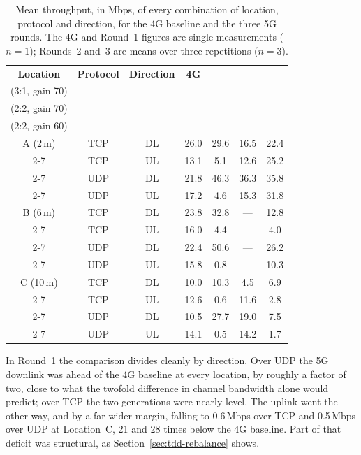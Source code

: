 \begin{table}[htbp]
    \centering
    \begin{tabular}{|c|c|c|c|c|c|c|}
        \hline
        \textbf{Location} & \textbf{Protocol} & \textbf{Direction} & \textbf{4G} & \makecell{\textbf{Round 1}\\(3:1, gain 70)} & \makecell{\textbf{Round 2}\\(2:2, gain 70)} & \makecell{\textbf{Round 3}\\(2:2, gain 60)} \\
        \hline
        A (2\,m) & TCP & DL & 26.0 & 29.6 & 16.5 & 22.4 \\
        \cline{2-7}
         & TCP & UL & 13.1 & 5.1 & 12.6 & 25.2 \\
        \cline{2-7}
         & UDP & DL & 21.8 & 46.3 & 36.3 & 35.8 \\
        \cline{2-7}
         & UDP & UL & 17.2 & 4.6 & 15.3 & 31.8 \\
        \hline
        B (6\,m) & TCP & DL & 23.8 & 32.8 & --- & 12.8 \\
        \cline{2-7}
         & TCP & UL & 16.0 & 4.4 & --- & 4.0 \\
        \cline{2-7}
         & UDP & DL & 22.4 & 50.6 & --- & 26.2 \\
        \cline{2-7}
         & UDP & UL & 15.8 & 0.8 & --- & 10.3 \\
        \hline
        C (10\,m) & TCP & DL & 10.0 & 10.3 & 4.5 & 6.9 \\
        \cline{2-7}
         & TCP & UL & 12.6 & 0.6 & 11.6 & 2.8 \\
        \cline{2-7}
         & UDP & DL & 10.5 & 27.7 & 19.0 & 7.5 \\
        \cline{2-7}
         & UDP & UL & 14.1 & 0.5 & 14.2 & 1.7 \\
        \hline
    \end{tabular}
    \caption[Mean throughput by location, protocol and direction.]{Mean throughput, in Mbps, of every combination of location, protocol and direction, for the 4G baseline and the three 5G rounds. The 4G and Round~1 figures are single measurements ($n=1$); Rounds~2 and~3 are means over three repetitions ($n=3$).}
    \label{tab:throughput-summary}
\end{table}

In Round~1 the comparison divides cleanly by direction. Over UDP the 5G downlink was ahead of the 4G baseline at every location, by roughly a factor of two, close to what the twofold difference in channel bandwidth alone would predict; over TCP the two generations were nearly level. The uplink went the other way, and by a far wider margin, falling to 0.6\,Mbps over TCP and 0.5\,Mbps over UDP at Location~C, 21 and 28 times below the 4G baseline. Part of that deficit was structural, as Section~\ref{sec:tdd-rebalance} shows.

